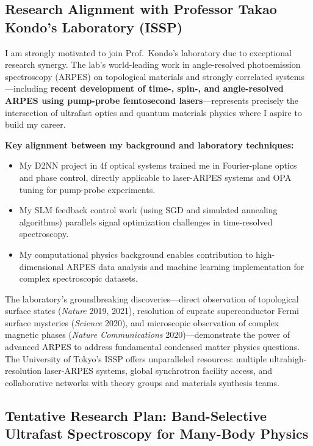 \documentclass[11pt,a4paper]{article}
\begin{document}
\subsection{Research Alignment with Professor Takao Kondo's Laboratory (ISSP)}

I am strongly motivated to join Prof.~Kondo's laboratory due to exceptional research synergy. The lab's world-leading work in angle-resolved photoemission spectroscopy (ARPES) on topological materials and strongly correlated systems—including \textbf{recent development of time-, spin-, and angle-resolved ARPES using pump-probe femtosecond lasers}—represents precisely the intersection of ultrafast optics and quantum materials physics where I aspire to build my career.

\textbf{Key alignment between my background and laboratory techniques:}
\begin{itemize}
    \item My D2NN project in 4f optical systems trained me in Fourier-plane optics and phase control, directly applicable to laser-ARPES systems and OPA tuning for pump-probe experiments.
    \item My SLM feedback control work (using SGD and simulated annealing algorithms) parallels signal optimization challenges in time-resolved spectroscopy.
    \item My computational physics background enables contribution to high-dimensional ARPES data analysis and machine learning implementation for complex spectroscopic datasets.
\end{itemize}

The laboratory's groundbreaking discoveries—direct observation of topological surface states (\textit{Nature} 2019, 2021), resolution of cuprate superconductor Fermi surface mysteries (\textit{Science} 2020), and microscopic observation of complex magnetic phases (\textit{Nature Communications} 2020)—demonstrate the power of advanced ARPES to address fundamental condensed matter physics questions. The University of Tokyo's ISSP offers unparalleled resources: multiple ultrahigh-resolution laser-ARPES systems, global synchrotron facility access, and collaborative networks with theory groups and materials synthesis teams.

\subsection{Tentative Research Plan: Band-Selective Ultrafast Spectroscopy for Many-Body Physics}
\end{document}
